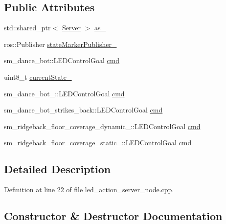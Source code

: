 \subsection*{Public Attributes}
\begin{DoxyCompactItemize}
\item 
std\+::shared\+\_\+ptr$<$ \hyperlink{odom__tracker__node_8cpp_a9884574d0480319430f628f79afc0500}{Server} $>$ \hyperlink{classLEDActionServer_a61d21c77642081acf017d4ebd65b2de0}{as\+\_\+}
\item 
ros\+::\+Publisher \hyperlink{classLEDActionServer_a4168a1e4a17eb1d65aaa059ce0c52086}{state\+Marker\+Publisher\+\_\+}
\item 
sm\+\_\+dance\+\_\+bot\+::\+L\+E\+D\+Control\+Goal \hyperlink{classLEDActionServer_a4d3a4c07e7659cdd78228932bb1634d3}{cmd}
\item 
uint8\+\_\+t \hyperlink{classLEDActionServer_a1dc456e987dc331501ad6ff2215661ff}{current\+State\+\_\+}
\item 
sm\+\_\+dance\+\_\+bot\+\_\+::\+L\+E\+D\+Control\+Goal \hyperlink{classLEDActionServer_a754ac14e0c9bde99ae28feb59c0801c0}{cmd}
\item 
sm\+\_\+dance\+\_\+bot\+\_\+strikes\+\_\+back\+::\+L\+E\+D\+Control\+Goal \hyperlink{classLEDActionServer_a219e3a4ae2a09887d601bc9b210294dd}{cmd}
\item 
sm\+\_\+ridgeback\+\_\+floor\+\_\+coverage\+\_\+dynamic\+\_\+::\+L\+E\+D\+Control\+Goal \hyperlink{classLEDActionServer_a38ceb1a2a5898788f4692e3b5fb393b2}{cmd}
\item 
sm\+\_\+ridgeback\+\_\+floor\+\_\+coverage\+\_\+static\+\_\+::\+L\+E\+D\+Control\+Goal \hyperlink{classLEDActionServer_a5c8b4836a7767e8a4ce05198a2a852e1}{cmd}
\end{DoxyCompactItemize}


\subsection{Detailed Description}


Definition at line 22 of file led\+\_\+action\+\_\+server\+\_\+node.\+cpp.



\subsection{Constructor \& Destructor Documentation}
\mbox{\label{classLEDActionServer_a6978c43940438b9fd8bfcd6b443092d3}} 
